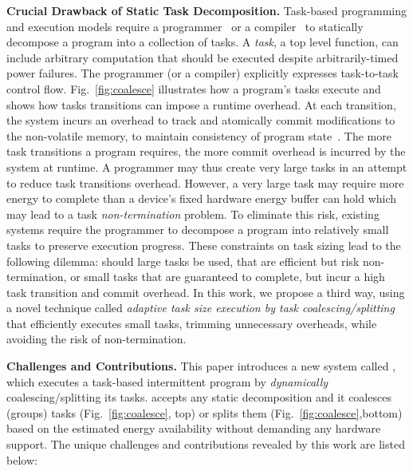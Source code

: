 \noindent\textbf{Crucial Drawback of Static Task Decomposition.} 
Task-based programming and execution models require a
programmer~\cite{alpaca,chain} or a compiler~\cite{baghsorkhi_cgo_2018} to
statically decompose a program into a collection of tasks. A \emph{task}, a top level function, can
include arbitrary computation that should be executed despite arbitrarily-timed power failures.
The programmer (or a compiler) explicitly expresses task-to-task control flow.
Fig.~\ref{fig:coalesce} illustrates how a program's tasks execute and shows how tasks transitions can impose a runtime overhead. At each transition, the system incurs an overhead to track and atomically commit modifications to the non-volatile memory, to maintain consistency of program state~\cite{chain,alpaca}. The more task transitions a program requires, the more commit overhead is incurred by the system at runtime.
%
A programmer may thus create very large tasks in an attempt to reduce task transitions
overhead. However, a very large task may require more energy to complete than a device's fixed hardware energy
buffer can hold which may lead to a task \emph{non-termination} problem. To eliminate this risk,
existing systems require the programmer to decompose a program into relatively small tasks to preserve execution progress. These constraints on task sizing lead to the following dilemma: should large tasks be used, that are efficient but risk non-termination, or small tasks that are guaranteed to complete, but incur a high task transition and commit overhead. In this work,
we propose a third way, using a novel technique called \emph{adaptive task size execution by task coalescing/splitting} that efficiently executes small tasks, trimming unnecessary overheads, while avoiding the risk of non-termination.

\noindent\textbf{Challenges and Contributions.}
This paper introduces a new system called \emph{\sys}, which executes a task-based
intermittent program by \emph{dynamically} coalescing/splitting its tasks.
\sys accepts any static decomposition and it coalesces (groups) tasks (Fig.~\ref{fig:coalesce}, top) or splits them (Fig.~\ref{fig:coalesce},bottom) based on the estimated energy availability without demanding any hardware support. The unique challenges and contributions revealed by this work are listed below:


